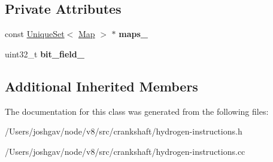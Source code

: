 \subsection*{Private Attributes}
\begin{DoxyCompactItemize}
\item 
const \hyperlink{classv8_1_1internal_1_1_unique_set}{Unique\+Set}$<$ \hyperlink{classv8_1_1internal_1_1_map}{Map} $>$ $\ast$ {\bfseries maps\+\_\+}\hypertarget{classv8_1_1internal_1_1_h_check_maps_adc723cb228270a4ac7190e20e41f6562}{}\label{classv8_1_1internal_1_1_h_check_maps_adc723cb228270a4ac7190e20e41f6562}

\item 
uint32\+\_\+t {\bfseries bit\+\_\+field\+\_\+}\hypertarget{classv8_1_1internal_1_1_h_check_maps_adbd74fd13070099838cf118ef024d784}{}\label{classv8_1_1internal_1_1_h_check_maps_adbd74fd13070099838cf118ef024d784}

\end{DoxyCompactItemize}
\subsection*{Additional Inherited Members}


The documentation for this class was generated from the following files\+:\begin{DoxyCompactItemize}
\item 
/\+Users/joshgav/node/v8/src/crankshaft/hydrogen-\/instructions.\+h\item 
/\+Users/joshgav/node/v8/src/crankshaft/hydrogen-\/instructions.\+cc\end{DoxyCompactItemize}
